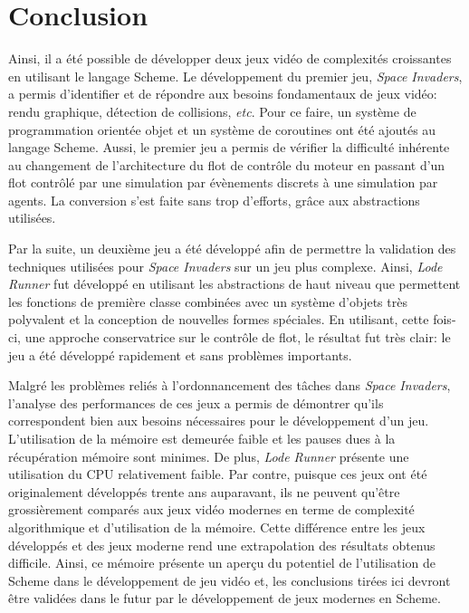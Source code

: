 \documentclass[12pt,twoside,letterpaper,francais]{book}
\begin{document}
\FloatBarrier
\section{Conclusion}
Ainsi, il a été possible de développer deux jeux vidéo de complexités
croissantes en utilisant le langage Scheme. Le dévelop\-pement du
premier jeu, \textit{Space Invaders}, a permis d'identifier et de
répondre aux besoins fondamentaux de jeux vidéo: rendu graphique,
détection de collisions, \textit{etc}. Pour ce faire, un système de
programmation orientée objet et un système de coroutines ont été
ajoutés au langage Scheme. Aussi, le premier jeu a permis de vérifier
la difficulté inhérente au changement de l'architecture du flot de
contrôle du moteur en passant d'un flot contrôlé par une simulation
par évènements discrets à une simulation par agents. La conversion
s'est faite sans trop d'efforts, grâce aux abstractions utilisées.

Par la suite, un deuxième jeu a été développé afin de permettre la
validation des techniques utilisées pour \textit{Space Invaders} sur
un jeu plus complexe. Ainsi, \textit{Lode Runner} fut développé en
utilisant les abstractions de haut niveau que permettent les fonctions
de première classe combinées avec un système d'objets très polyvalent
et la conception de nouvelles formes spéciales. En utilisant, cette
fois-ci, une approche conservatrice sur le contrôle de flot, le
résultat fut très clair: le jeu a été développé rapidement et sans
problèmes importants.

Malgré les problèmes reliés à l'ordonnancement des tâches dans
\textit{Space Invaders}, l'analyse des performances de ces jeux a
permis de démontrer qu'ils correspondent bien aux besoins nécessaires
pour le développement d'un jeu. L'utilisation de la mémoire est
demeurée faible et les pauses dues à la récupération mémoire sont
minimes. De plus, \textit{Lode Runner} présente une utilisation du CPU
relativement faible. Par contre, puisque ces jeux ont été
originalement développés trente ans auparavant, ils ne peuvent qu'être
grossièrement comparés aux jeux vidéo modernes en terme de complexité
algorithmique et d'utilisation de la mémoire. Cette différence entre
les jeux développés et des jeux moderne rend une extrapolation des
résultats obtenus difficile. Ainsi, ce mémoire présente un aperçu du
potentiel de l'utilisation de Scheme dans le développement de jeu
vidéo et, les conclusions tirées ici devront être validées dans le
futur par le développement de jeux modernes en Scheme.
\end{document}
